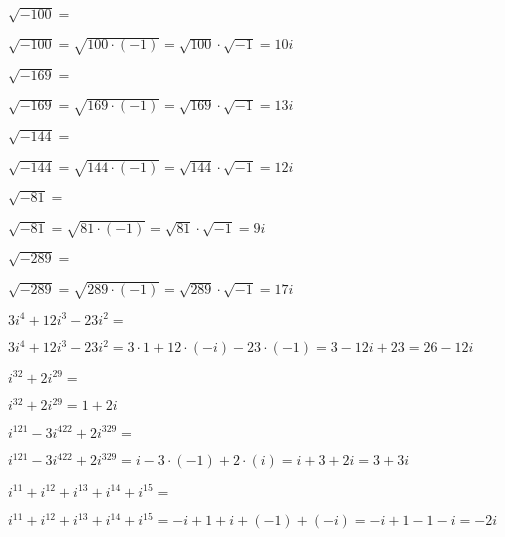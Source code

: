 \documentclass[12pt,addpoints,x11names]{exam}
\begin{document}
\begin{questions}
\question[2] $\sqrt{-100}=$
   \begin{solutionbox}{.5in}
    $\sqrt{-100}=\sqrt{100\cdot(-1)}=\sqrt{100}\cdot\sqrt{-1}=10i$
  \end{solutionbox}
   \question[2] $\sqrt{-169}=$
   \begin{solutionbox}{.5in}
    $\sqrt{-169}=\sqrt{169\cdot(-1)}=\sqrt{169}\cdot\sqrt{-1}=13i$
  \end{solutionbox}
\question[2] $\sqrt{-144}=$
   \begin{solutionbox}{1in}
    $\sqrt{-144}=\sqrt{144\cdot(-1)}=\sqrt{144}\cdot\sqrt{-1}=12i$
  \end{solutionbox}
  \question[2] $\sqrt{-81}=$
   \begin{solutionbox}{1in}
    $\sqrt{-81}=\sqrt{81\cdot(-1)}=\sqrt{81}\cdot\sqrt{-1}=9i$
  \end{solutionbox}
\question[2] $\sqrt{-289}=$
  \begin{solutionbox}{1in}
    $\sqrt{-289}=\sqrt{289\cdot(-1)}=\sqrt{289}\cdot\sqrt{-1}=17i$
  \end{solutionbox}

  \pagebreak
\question[3] $3i^{4}+12i^{3}-23i^{2}=$
   \begin{solutionbox}{1.5in}
     $3i^{4}+12i^{3}-23i^{2}=3\cdot1+12\cdot(-i)-23\cdot(-1)=3-12i+23=26-12i$
   \end{solutionbox}
\question[3] $i^{32}+2i^{29}=$
  \begin{solutionbox}{1.5in}
    $i^{32}+2i^{29}=1+2i$
  \end{solutionbox}
 \question[3] $i^{121}-3i^{422}+2i^{329}=$
   \begin{solutionbox}{1.5in}
    $i^{121}-3i^{422}+2i^{329}=i-3\cdot(-1)+2\cdot(i)=i+3+2i=3+3i$
  \end{solutionbox} 
\question[3] $i^{11}+i^{12}+i^{13}+i^{14}+i^{15}=$
  \begin{solutionbox}{1.5in}
     $i^{11}+i^{12}+i^{13}+i^{14}+i^{15}=-i+1+i+(-1)+(-i)=-i+1-1-i=-2i$
  \end{solutionbox}
  \pagebreak


\end{questions}
\end{document}
